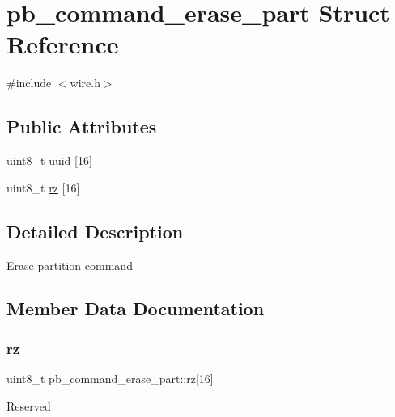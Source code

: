 \hypertarget{structpb__command__erase__part}{}\section{pb\+\_\+command\+\_\+erase\+\_\+part Struct Reference}
\label{structpb__command__erase__part}


{\ttfamily \#include $<$wire.\+h$>$}

\subsection*{Public Attributes}
\begin{DoxyCompactItemize}
\item 
uint8\+\_\+t \hyperlink{structpb__command__erase__part_ad7c0a5ecf5c2811771bccd4f6e306962}{uuid} \mbox{[}16\mbox{]}
\item 
uint8\+\_\+t \hyperlink{structpb__command__erase__part_a31f332f2f1f75a4dc4437bb29442b0c5}{rz} \mbox{[}16\mbox{]}
\end{DoxyCompactItemize}


\subsection{Detailed Description}
Erase partition command 

\subsection{Member Data Documentation}
\mbox{\label{structpb__command__erase__part_a31f332f2f1f75a4dc4437bb29442b0c5}} 
\subsubsection{\texorpdfstring{rz}{rz}}
{\footnotesize\ttfamily uint8\+\_\+t pb\+\_\+command\+\_\+erase\+\_\+part\+::rz\mbox{[}16\mbox{]}}

Reserved \mbox{\label{structpb__command__erase__part_ad7c0a5ecf5c2811771bccd4f6e306962}} 
